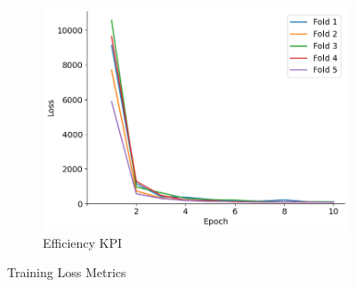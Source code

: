\documentclass{report} %
\begin{document}
\begin{figure}[H]
\begin{subfigure}{0.32\textwidth}
        \centering
        \includegraphics[width=\textwidth]{./ReportImages/train_loss_y2.png}
        \caption{\centering Efficiency \ac{KPI}}
        \label{fig:Training Loss for Efficiency grid}
    \end{subfigure}
    \caption{Training Loss Metrics}
    \label{fig:Training Loss Metrics}
\end{figure}
\end{document}
